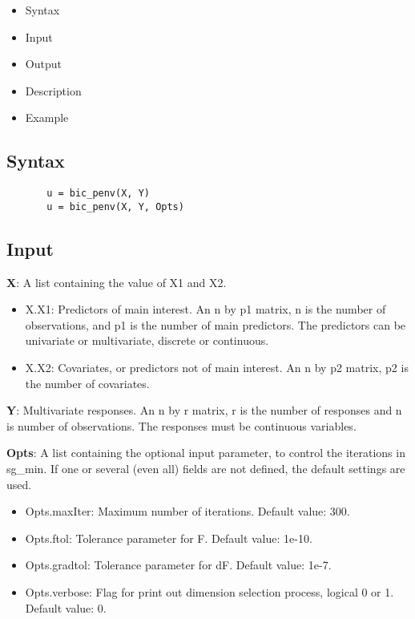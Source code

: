 \documentclass[a4paper,11pt,openany]{memoir}
\begin{document}
\begin{itemize}
\setlength{\itemsep}{-1ex}
   \item Syntax
   \item Input
   \item Output
   \item Description
   \item Example
\end{itemize}


\subsection*{Syntax}


\begin{verbatim}       u = bic_penv(X, Y)
       u = bic_penv(X, Y, Opts)\end{verbatim}
    

\subsection*{Input}

\begin{par}
\textbf{X}: A list containing the value of X1 and X2.
\end{par} \vspace{1em}
\begin{itemize}
\setlength{\itemsep}{-1ex}
   \item X.X1: Predictors of main interest. An n by p1 matrix, n is the number of observations, and p1 is the number of main predictors. The predictors can be univariate or multivariate, discrete or continuous.
   \item X.X2: Covariates, or predictors not of main interest.  An n by p2 matrix, p2 is the number of covariates.
\end{itemize}
\begin{par}
\textbf{Y}: Multivariate responses. An n by r matrix, r is the number of responses and n is number of observations. The responses must be continuous variables.
\end{par} \vspace{1em}
\begin{par}
\textbf{Opts}: A list containing the optional input parameter, to control the iterations in sg\_min. If one or several (even all) fields are not defined, the default settings are used.
\end{par} \vspace{1em}
\begin{itemize}
\setlength{\itemsep}{-1ex}
   \item Opts.maxIter: Maximum number of iterations.  Default value: 300.
   \item Opts.ftol: Tolerance parameter for F.  Default value: 1e-10.
   \item Opts.gradtol: Tolerance parameter for dF.  Default value: 1e-7.
   \item Opts.verbose: Flag for print out dimension selection process, logical 0 or 1. Default value: 0.
\end{itemize}
\end{document}
